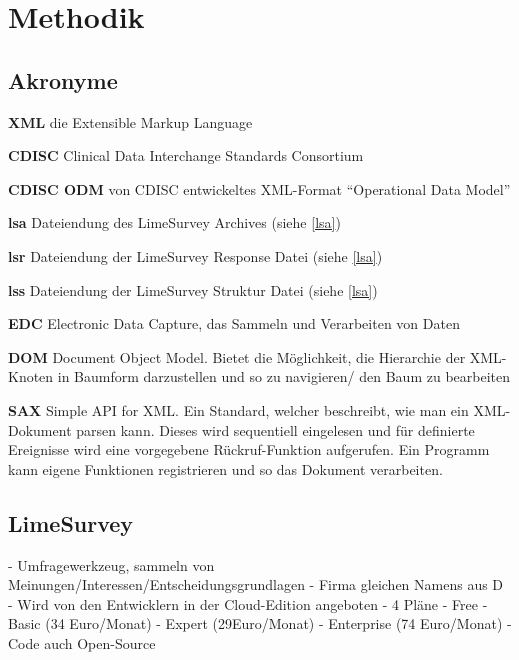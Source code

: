 \chapter{Methodik}
\label{ch:methodik}

\section{Akronyme}

\begin{description}[font=\sffamily\bfseries, leftmargin=0cm, itemsep=-0.15cm, style=nextline]
	\item \textbf{XML} die Extensible Markup Language
	\item \textbf{CDISC} Clinical Data Interchange Standards Consortium
	\item \textbf{CDISC ODM} von CDISC entwickeltes XML-Format \enquote{Operational Data Model}
	\item \textbf{lsa} Dateiendung des LimeSurvey Archives (siehe \cref{lsa})
	\item \textbf{lsr} Dateiendung der LimeSurvey Response Datei (siehe \cref{lsa})
	\item \textbf{lss} Dateiendung der LimeSurvey Struktur Datei (siehe \cref{lsa})
	\item \textbf{EDC} Electronic Data Capture, das Sammeln und Verarbeiten von Daten
	\item \textbf{DOM} Document Object Model. Bietet die Möglichkeit, die Hierarchie der XML-Knoten in Baumform darzustellen und so zu navigieren/ den Baum zu bearbeiten
	\item \textbf{SAX} Simple API for XML. Ein Standard, welcher beschreibt, wie man ein XML-Dokument parsen kann. Dieses wird sequentiell eingelesen und für definierte Ereignisse wird eine vorgegebene Rückruf-Funktion aufgerufen. Ein Programm kann eigene Funktionen registrieren und so das Dokument verarbeiten.
\end{description}

\section{LimeSurvey}

- Umfragewerkzeug, sammeln von Meinungen/Interessen/Entscheidungsgrundlagen
- Firma gleichen Namens aus D
- Wird von den Entwicklern in der Cloud-Edition angeboten
- 4 Pläne
	- Free
	- Basic (34 Euro/Monat)
	- Expert (29Euro/Monat)
	- Enterprise (74 Euro/Monat)
- Code auch Open-Source

